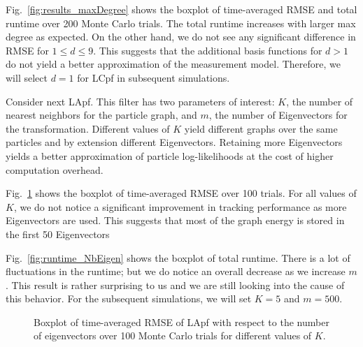 \documentclass[10pt,letterpaper,final]{article}
\begin{document}
Fig.~\ref{fig:results_maxDegree} shows the boxplot of time-averaged RMSE and total runtime over 200 Monte Carlo trials. The total runtime increases with larger max degree as expected. On the other hand, we do not see any significant difference in RMSE for $1\leq d \leq 9$. This suggests that the additional basis functions for $d>1$ do not yield a better approximation of the measurement model. Therefore, we will select $d=1$ for LCpf in subsequent simulations. 

Consider next LApf. This filter has two parameters of interest: $K$, the number of nearest neighbors for the particle graph, and $m$, the number of Eigenvectors for the transformation. Different values of $K$ yield different graphs over the same particles and by extension different Eigenvectors. Retaining more Eigenvectors yields a better approximation of particle log-likelihoods at the cost of higher computation overhead. 

Fig.~\ref{fig:RMSE_NbEigen} shows the boxplot of time-averaged RMSE over 100 trials. For all values of $K$, we do not notice a significant improvement in tracking performance as more Eigenvectors are used. This suggests that most of the graph energy is stored in the first 50 Eigenvectors

Fig.~\ref{fig:runtime_NbEigen} shows the boxplot of total runtime. There is a lot of fluctuations in the runtime; but we do notice an overall decrease as we increase $m$. This result is rather surprising to us and we are still looking into the cause of this behavior. For the subsequent simulations, we will set $K=5$ and $m=500$. 

\begin{figure}
\centering
{}
\caption{Boxplot of time-averaged RMSE of LApf with respect to the number of eigenvectors over 100 Monte Carlo trials for different values of $K$.}
\label{fig:RMSE_NbEigen}
\end{figure}
\end{document}
